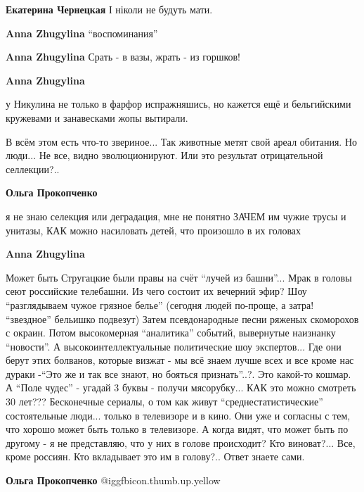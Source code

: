\begin{itemize}
\begin{itemize}
\textbf{Екатерина Чернецкая} І ніколи не будуть мати.

\textbf{Anna Zhugylina} \enquote{воспоминания}

\textbf{Anna Zhugylina} Срать - в вазы, жрать - из горшков!

\textbf{Anna Zhugylina} 

у Никулина не только в фарфор испражняшись, но кажется ещё и бельгийскими
кружевами и занавесками жопы вытирали.


В всём этом есть что-то звериное... Так животные метят свой ареал обитания. Но
люди... Не все, видно эволюционируют. Или это результат отрицательной
селлекции?..

\textbf{Ольга Прокопченко} 

я не знаю селекция или деградация, мне не понятно ЗАЧЕМ им чужие трусы и
унитазы, КАК можно насиловать детей, что произошло в их головах

\textbf{Anna Zhugylina} 

Может быть Стругацкие были правы на счёт \enquote{лучей из башни}... Мрак в
головы сеют российские телебашни. Из чего состоит их вечерний эфир? Шоу
\enquote{разглядываем чужое грязное белье} (сегодня людей по-проще, а затра!
\enquote{звездное} бельишко подвезут) Затем псевдонародные песни ряженых
скоморохов с окраин. Потом высокомерная \enquote{аналитика} событий, вывернутые
наизнанку \enquote{новости}. А высокоинтеллектуальные политические шоу
экспертов... Где они берут этих болванов, которые визжат - мы всё знаем лучше
всех и все кроме нас дураки -\enquote{Это же и так все знают, но бояться
признать}..?. Это какой-то кошмар. А \enquote{Поле чудес} - угадай 3 буквы -
получи мясорубку... КАК это можно смотреть 30 лет??? Бесконечные сериалы, о том
как живут \enquote{среднестатистические} состоятельные люди... только в
телевизоре и в кино. Они уже и согласны с тем, что хорошо может быть только в
телевизоре. А когда видят, что может быть по другому - я не представляю, что у
них в голове происходит? Кто виноват?... Все, кроме россиян. Кто вкладывает это
им в голову?.. Ответ знаете сами.

\textbf{Ольга Прокопченко}  @igg{fbicon.thumb.up.yellow} 


\end{itemize} %

\end{itemize} %
